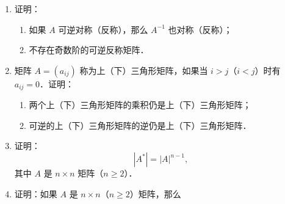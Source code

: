 \begin{enumerate}
\begin{enumerate}
  \anssub
    \item
    \[
      \begin{pmatrix}
        1&1&1&\cdots&1&1\\
        0&1&1&\cdots&1&1\\
        0&0&1&\cdots&1&1\\
        \vdots&\vdots&\vdots&&\vdots&\vdots\\
        0&0&0&\cdots&0&1
      \end{pmatrix}_{n\times n}
      X=
      \begin{pmatrix}
        2&1&0&\cdots&0&0\\
        1&2&1&\cdots&0&0\\
        0&1&2&\cdots&0&0\\
        \vdots&\vdots&\vdots&&\vdots&\vdots\\
        0&0&0&\cdots&1&2
      \end{pmatrix}_{n\times n};
    \]
  \anssub
    \item $X\begin{pmatrix}1&1&-1\\0&2&2\\1&-1&0\end{pmatrix}=\begin{pmatrix}1&-1&1\\1&1&0\\2&1&1\end{pmatrix}$．
  \anssub
  \end{enumerate}
  \item 证明：
  \begin{enumerate}
    \item 如果 $A$ 可逆对称（反称），那么 $A^{-1}$ 也对称（反称）；
  \anssub
    \item 不存在奇数阶的可逆反称矩阵．
  \anssub
  \end{enumerate}
  \item 矩阵 $A=(a_{ij})$ 称为上（下）三角形矩阵，如果当 $i>j$（$i<j$）时有 $a_{ij}=0$．证明：
  \begin{enumerate}
    \item 两个上（下）三角形矩阵的乘积仍是上（下）三角形矩阵；
  \anssub
    \item 可逆的上（下）三角形矩阵的逆仍是上（下）三角形矩阵．
  \anssub
  \end{enumerate}
  \item 证明：
  \[
    |A^*|=|A|^{n-1},
  \]
  其中 $A$ 是 $n\times n$ 矩阵（$n\geqslant2$）．
  \ansproof
  \item 证明：如果 $A$ 是 $n\times n$（$n\geqslant2$）矩阵，那么

\end{enumerate}
